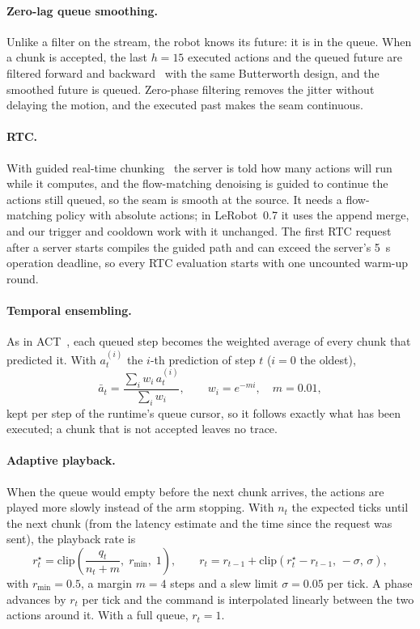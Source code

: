 \paragraph{Zero-lag queue smoothing.} Unlike a filter on the stream, the robot knows its future: it is in the queue.
When a chunk is accepted, the last $h=15$ executed actions and the queued future are filtered forward and
backward~\cite{gustafsson1996} with the same Butterworth design, and the smoothed future is queued. Zero-phase
filtering removes the jitter without delaying the motion, and the executed past makes the seam continuous.

\paragraph{RTC.}\label{sec:rtcmethod} With guided real-time chunking~\cite{black2025rtc} the server is told how many
actions will run while it computes, and the flow-matching denoising is guided to continue the actions still queued, so
the seam is smooth at the source. It needs a flow-matching policy with absolute actions; in LeRobot~0.7 it uses the
append merge, and our \drtc{} trigger and cooldown work with it unchanged. The first RTC request after a server starts
compiles the guided path and can exceed the server's 5~s operation deadline, so every RTC evaluation starts with one
uncounted warm-up round.

\paragraph{Temporal ensembling.} As in ACT~\cite{zhao2023act}, each queued step becomes the weighted average of every
chunk that predicted it. With $a^{(i)}_t$ the $i$-th prediction of step $t$ ($i=0$ the oldest),
\begin{equation}
  \bar a_t = \frac{\sum_i w_i\, a^{(i)}_t}{\sum_i w_i}, \qquad w_i = e^{-m i}, \quad m = 0.01,
\end{equation}
kept per step of the runtime's queue cursor, so it follows exactly what has been executed; a chunk that is not
accepted leaves no trace.

\paragraph{Adaptive playback.} When the queue would empty before the next chunk arrives, the actions are played more
slowly instead of the arm stopping. With $n_t$ the expected ticks until the next chunk (from the latency estimate and
the time since the request was sent), the playback rate is
\begin{equation}
  r^\star_t = \mathrm{clip}\!\left(\frac{q_t}{n_t + m},\; r_{\min},\; 1\right), \qquad
  r_t = r_{t-1} + \mathrm{clip}\!\left(r^\star_t - r_{t-1},\, -\sigma,\, \sigma\right),
\end{equation}
with $r_{\min}=0.5$, a margin $m=4$ steps and a slew limit $\sigma=0.05$ per tick. A phase advances by $r_t$ per tick
and the command is interpolated linearly between the two actions around it. With a full queue, $r_t=1$.

